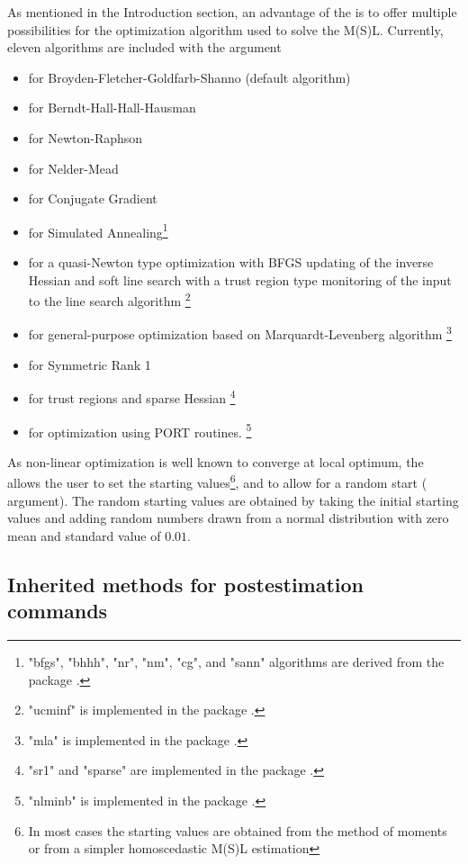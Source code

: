 \documentclass[nojss]{jss}
\begin{document}
As mentioned in the Introduction section, an advantage of the  is to
offer multiple possibilities for the optimization algorithm used to solve the
M(S)L. Currently, eleven algorithms are included with the argument 
%
\begin{itemize} \itemsep 10pt
\item {} for Broyden-Fletcher-Goldfarb-Shanno (default algorithm)
\item {} for Berndt-Hall-Hall-Hausman
\item {} for Newton-Raphson
\item {} for Nelder-Mead
\item {} for Conjugate Gradient
\item {} for Simulated Annealing\footnote{"bfgs", "bhhh", "nr", "nm", 
"cg", and "sann" algorithms are derived from the  package \citep{maxlik}.} 
\item {} for a quasi-Newton type optimization with BFGS updating 
of the inverse Hessian and soft line search with a trust region type monitoring 
of the input to the line search algorithm \footnote{"ucminf" is implemented in 
the  package \citep{ucminf}.}
\item {} for general-purpose optimization based on Marquardt-Levenberg 
algorithm \footnote{"mla" is implemented in 
the  package \citep{mla}.}
\item {} for Symmetric Rank 1 
\item {} for trust regions and sparse Hessian \footnote{"sr1" and 
"sparse" are implemented in the  package \citep{trust}.}
\item {} for optimization using PORT routines. \footnote{"nlminb" 
is implemented in the  package \citep{stats}.}
\end{itemize}
%
As non-linear optimization is well known to converge at local optimum, the
 allows the user to set the starting values\footnote{In most cases the 
starting values are obtained from the method of moments or from a simpler homoscedastic M(S)L 
estimation}, and to allow for a random start ( argument). The
random starting values are obtained by taking the initial starting values and 
adding random numbers drawn from a normal distribution with zero mean and 
standard value of $0.01$.

\subsection{Inherited methods for postestimation commands}
\end{document}
